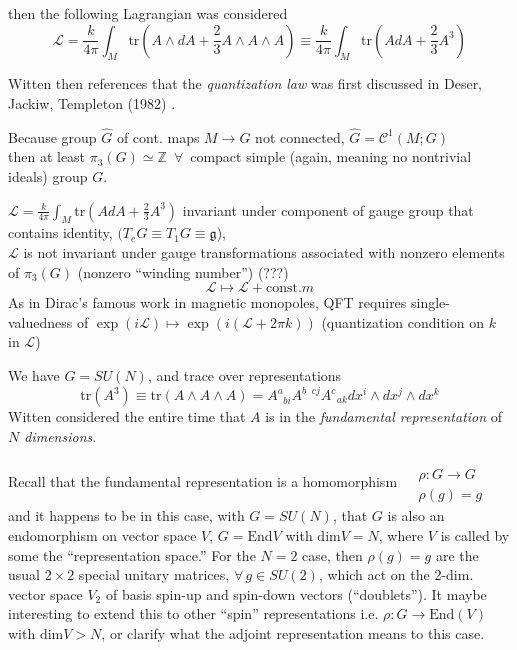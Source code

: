 \documentclass[10pt]{amsart}
\begin{document}
\begin{multicols}{2}
then the following Lagrangian was considered
\[
\mathcal{L} = \frac{k}{4\pi} \int_M \text{tr}(A \wedge dA + \frac{2}{3} A \wedge A \wedge A ) \equiv \frac{k}{4\pi } \int_M \text{tr}(AdA + \frac{2}{3}A^3)
\]

Witten then references that the \emph{quantization law} was first discussed in Deser, Jackiw, Templeton (1982) \cite{DJT1982}.

Because group $\widehat{G}$ of cont. maps $M \to G$ not connected, $\widehat{G} = \mathcal{C}^1(M;G)$  \\
\phantom{\qquad} then at least $\pi_3(G) \simeq \mathbb{Z}$\, $\forall \, $ compact simple (again, meaning no nontrivial ideals) group $G$.  

$\mathcal{L} = \frac{k}{4\pi } \int_M \text{tr}(AdA + \frac{2}{3} A^3)$ invariant under component of gauge group that contains identity, $(T_eG \equiv T_1G \equiv \mathfrak{g}$), \\

$\mathcal{L}$ is not invariant under gauge transformations associated with nonzero elements of $\pi_3(G)$ (nonzero ``winding number'') (???)
\[
\mathcal{L} \mapsto \mathcal{L} + \text{const.}m
\]
As in Dirac's famous work in magnetic monopoles, QFT requires  single-valuedness of $\exp{(i\mathcal{L})} \mapsto \exp{(i(\mathcal{L} + 2\pi k )) }$ (quantization condition on $k$ in $\mathcal{L}$)

We have $G=SU(N)$, and trace over representations
\[
\text{tr}(A^3) \equiv \text{tr}(A\wedge A \wedge A) = A^a_{\; \; bi } A^{b \; \; cj} A^c_{ \; \; ak} dx^i \wedge dx^j \wedge dx^k
\]
Witten considered the entire time that $A$ is in the \emph{fundamental representation} of \emph{$N$ dimensions}.

Recall that the fundamental representation is a homomorphism $\begin{aligned} & \quad \\
  & \rho : G \to G \\ & \rho(g)=g \end{aligned}$
and it happens to be in this case, with $G=SU(N)$, that $G$ is also an endomorphism on vector space $V$, $G=\text{End}V$ with $\text{dim}V=N$, where $V$ is called by some the ``representation space.''  For the $N=2$ case, then $\rho(g)=g$ are the usual $2\times 2$ special unitary matrices, $\forall \, g \in SU(2)$, which act on the 2-dim. vector space $V_2$ of basis spin-up and spin-down vectors (``doublets'').  It maybe interesting to extend this to other ``spin'' representations i.e. $\rho:G \to \text{End}(V)$ with $\text{dim}V > N$, or clarify what the adjoint representation means to this case.


\end{multicols}
\end{document}
